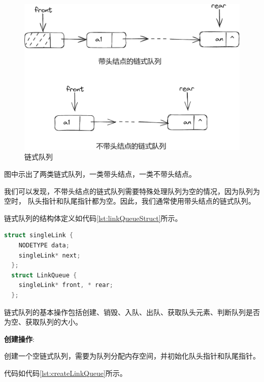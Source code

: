 \documentclass[lang=cn,newtx,10pt,scheme=chinese]{elegantbook}
\begin{document}
\begin{figure}[h]
  \centering
  \includegraphics[width=1\textwidth]{./figure/pdf/cropped/linkQueue.pdf}
  \caption{链式队列}
  \label{fig:linkQueue}
\end{figure}

图中示出了两类链式队列，一类带头结点，一类不带头结点。

我们可以发现，不带头结点的链式队列需要特殊处理队列为空的情况，因为队列为空时，
队头指针和队尾指针都为空。因此，我们通常使用带头结点的链式队列。

链式队列的结构体定义如代码\ref{lst:linkQueueStruct}所示。

\begin{lstlisting}[language=C++, caption={链式队列结构体定义}, label={lst:linkQueueStruct}]
  struct singleLink {
	NODETYPE data;
	singleLink* next;
  }; 
  struct LinkQueue {
    singleLink* front, * rear;
  };
\end{lstlisting}

链式队列的基本操作包括创建、销毁、入队、出队、获取队头元素、判断队列是否为空、获取队列的大小。

\textbf{创建操作}:

创建一个空链式队列，需要为队列分配内存空间，并初始化队头指针和队尾指针。

代码如代码\ref{lst:createLinkQueue}所示。
\end{document}
